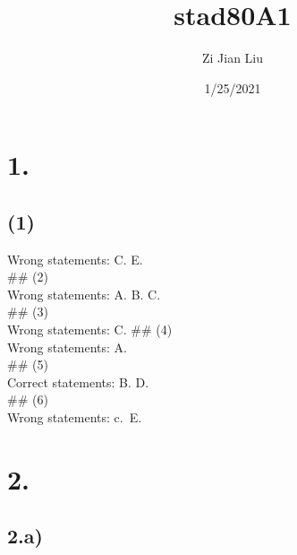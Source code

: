 \documentclass[
]{article}
\title{stad80A1}
\author{Zi Jian Liu}
\date{1/25/2021}
\begin{document}
\maketitle

{
\setcounter{tocdepth}{2}
\tableofcontents
}
\hypertarget{section}{%
\section{1.}\label{section}}

\hypertarget{section-1}{%
\subsection{(1)}\label{section-1}}

Wrong statements: C. E.\\
\#\# (2)\\
Wrong statements: A. B. C.\\
\#\# (3)\\
Wrong statements: C. \#\# (4)\\
Wrong statements: A.\\
\#\# (5)\\
Correct statements: B. D.\\
\#\# (6)\\
Wrong statements: c.~E.

\hypertarget{section-2}{%
\section{2.}\label{section-2}}

\hypertarget{a}{%
\subsection{2.a)}\label{a}}
\end{document}
